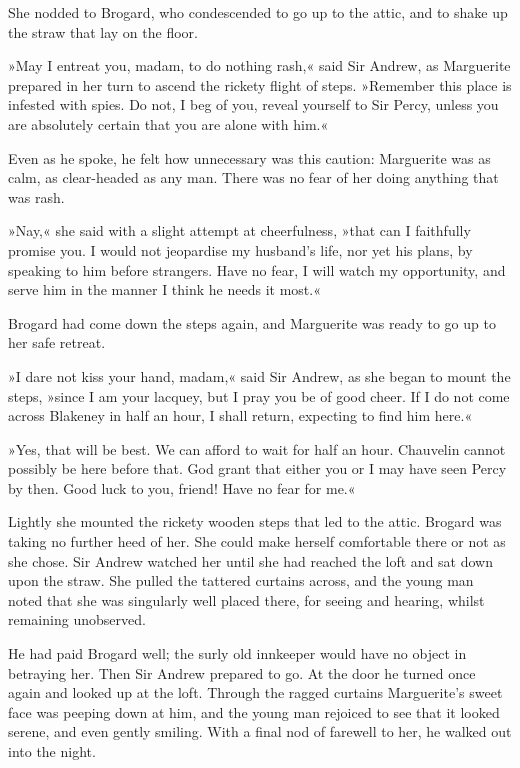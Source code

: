 She nodded to Brogard, who condescended to go up to the attic, and to shake up the straw that lay on the floor.

»May I entreat you, madam, to do nothing rash,« said Sir Andrew, as Marguerite prepared in her turn to ascend the rickety flight of steps. »Remember this place is infested with spies. Do not, I beg of you, reveal yourself to Sir Percy, unless you are absolutely certain that you are alone with him.«

Even as he spoke, he felt how unnecessary was this caution: Marguerite was as calm, as clear-headed as any man. There was no fear of her doing anything that was rash.

»Nay,« she said with a slight attempt at cheerfulness, »that can I faithfully promise you. I would not jeopardise my husband's life, nor yet his plans, by speaking to him before strangers. Have no fear, I will watch my opportunity, and serve him in the manner I think he needs it most.«

Brogard had come down the steps again, and Marguerite was ready to go up to her safe retreat.

»I dare not kiss your hand, madam,« said Sir Andrew, as she began to mount the steps, »since I am your lacquey, but I pray you be of good cheer. If I do not come across Blakeney in half an hour, I shall return, expecting to find him here.«

»Yes, that will be best. We can afford to wait for half an hour. Chauvelin cannot possibly be here before that. God grant that either you or I may have seen Percy by then. Good luck to you, friend! Have no fear for me.«

Lightly she mounted the rickety wooden steps that led to the attic. Brogard was taking no further heed of her. She could make herself comfortable there or not as she chose. Sir Andrew watched her until she had reached the loft and sat down upon the straw. She pulled the tattered curtains across, and the young man noted that she was singularly well placed there, for seeing and hearing, whilst remaining unobserved.

He had paid Brogard well; the surly old innkeeper would have no object in betraying her. Then Sir Andrew prepared to go. At the door he turned once again and looked up at the loft. Through the ragged curtains Marguerite's sweet face was peeping down at him, and the young man rejoiced to see that it looked serene, and even gently smiling. With a final nod of farewell to her, he walked out into the night.